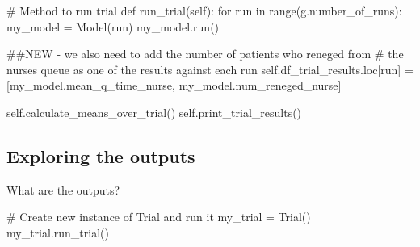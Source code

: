 \documentclass[
  letterpaper,
  DIV=11,
  numbers=noendperiod]{scrreprt}
\newenvironment{Shaded}{}{}
\newcommand{\BuiltInTok}[1]{\textcolor[rgb]{0.84,0.23,0.29}{#1}}
\newcommand{\CommentTok}[1]{\textcolor[rgb]{0.42,0.45,0.49}{#1}}
\newcommand{\ControlFlowTok}[1]{\textcolor[rgb]{0.84,0.23,0.29}{#1}}
\newcommand{\KeywordTok}[1]{\textcolor[rgb]{0.84,0.23,0.29}{#1}}
\newcommand{\NormalTok}[1]{\textcolor[rgb]{0.14,0.16,0.18}{#1}}
\newcommand{\OperatorTok}[1]{\textcolor[rgb]{0.14,0.16,0.18}{#1}}
\newcommand{\VariableTok}[1]{\textcolor[rgb]{0.89,0.38,0.04}{#1}}
\begin{document}
\begin{tcolorbox}
\begin{Shaded}
\begin{Highlighting}[]
    \CommentTok{\# Method to run trial}
    \KeywordTok{def}\NormalTok{ run\_trial(}\VariableTok{self}\NormalTok{):}
        \ControlFlowTok{for}\NormalTok{ run }\KeywordTok{in} \BuiltInTok{range}\NormalTok{(g.number\_of\_runs):}
\NormalTok{            my\_model }\OperatorTok{=}\NormalTok{ Model(run)}
\NormalTok{            my\_model.run()}

            \CommentTok{\#\#NEW {-} we also need to add the number of patients who reneged from}
            \CommentTok{\# the nurse\textquotesingle{}s queue as one of the results against each run}
            \VariableTok{self}\NormalTok{.df\_trial\_results.loc[run] }\OperatorTok{=}\NormalTok{ [my\_model.mean\_q\_time\_nurse,}
\NormalTok{                                              my\_model.num\_reneged\_nurse]}

        \VariableTok{self}\NormalTok{.calculate\_means\_over\_trial()}
        \VariableTok{self}\NormalTok{.print\_trial\_results()}
\end{Highlighting}
\end{Shaded}

\end{tcolorbox}

\subsection{Exploring the outputs}\label{exploring-the-outputs}

What are the outputs?

\begin{Shaded}
\begin{Highlighting}[]
\CommentTok{\# Create new instance of Trial and run it}
\NormalTok{my\_trial }\OperatorTok{=}\NormalTok{ Trial()}
\NormalTok{my\_trial.run\_trial()}
\end{Highlighting}
\end{Shaded}
\end{document}
